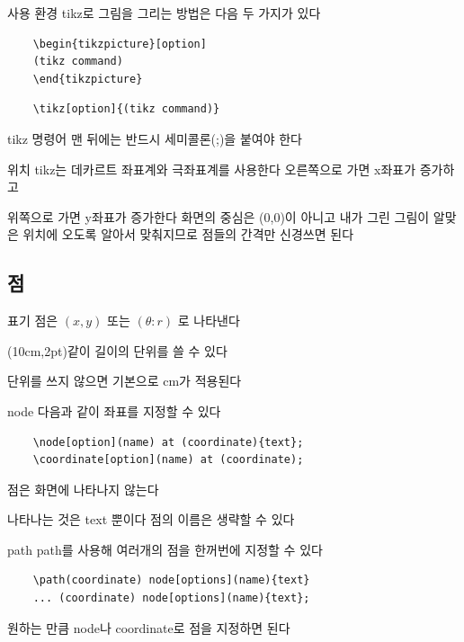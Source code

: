 \documentclass[12pt]{beamer}
\begin{document}
\begin{frame}[fragile]{사용 환경}
	tikz로 그림을 그리는 방법은 다음 두 가지가 있다
	\vfill
	\begin{lstlisting}
	\begin{tikzpicture}[option]
	(tikz command)
	\end{tikzpicture}
	\end{lstlisting}
	\vfill
	\begin{lstlisting}
	\tikz[option]{(tikz command)}
	\end{lstlisting}
	\vfill
	tikz 명령어 맨 뒤에는 반드시 세미콜론(;)을 붙여야 한다
\end{frame}

\begin{frame}{위치}
	tikz는 데카르트 좌표계와 극좌표계를 사용한다
	\vfill
	오른쪽으로 가면 x좌표가 증가하고
	
	위쪽으로 가면 y좌표가 증가한다
	\vfill
	화면의 중심은 (0,0)이 아니고 내가 그린 그림이 알맞은 위치에 오도록 알아서 맞춰지므로 점들의 간격만 신경쓰면 된다
\end{frame}


\subsection{점}

\begin{frame}{\secname}{표기}
	점은 \((x,y)\) 또는 \((\theta:r)\) 로 나타낸다
	
	\vfill
	(10cm,2pt)같이 길이의 단위를 쓸 수 있다
	
	단위를 쓰지 않으면 기본으로 cm가 적용된다
\end{frame}

\begin{frame}[fragile]{\secname}{node}
	다음과 같이 좌표를 지정할 수 있다
	\begin{lstlisting}
	\node[option](name) at (coordinate){text};
	\coordinate[option](name) at (coordinate);
	\end{lstlisting}
	\vfill
	점은 화면에 나타나지 않는다
	
	나타나는 것은 text 뿐이다
	\vfill
	점의 이름은 생략할 수 있다
	
\end{frame}

\begin{frame}[fragile]{\secname}{path}
	path를 사용해 여러개의 점을 한꺼번에 지정할 수 있다
	
	\begin{lstlisting}
	\path(coordinate) node[options](name){text}
	... (coordinate) node[options](name){text};
	\end{lstlisting}
	\vfill
	원하는 만큼 node나 coordinate로 점을 지정하면 된다
	
\end{frame}
\end{document}
